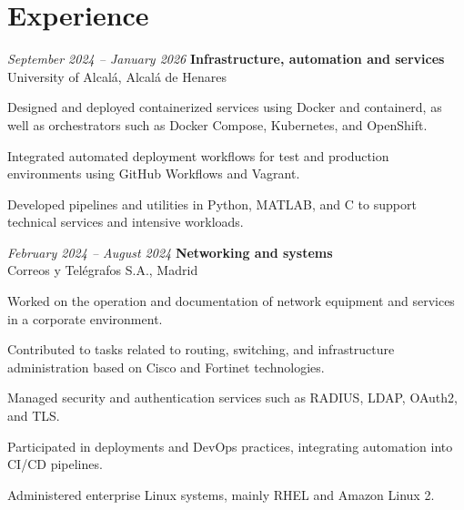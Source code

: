 \vspace{-7pt}

\section{Experience}

\begin{twocolentry}{\textit{September 2024 – January 2026}}
	\textbf{Infrastructure, automation and services} \\
	University of Alcalá, Alcalá de Henares
\end{twocolentry}
\begin{onecolentry}
	\begin{highlights}
		\item Designed and deployed containerized services using Docker and containerd, as well as orchestrators such as Docker Compose, Kubernetes, and OpenShift.
		\item Integrated automated deployment workflows for test and production environments using GitHub Workflows and Vagrant.
		\item Developed pipelines and utilities in Python, MATLAB, and C to support technical services and intensive workloads.
	\end{highlights}
\end{onecolentry}

\vspace{0.2 cm}

\begin{twocolentry}{\textit{February 2024 – August 2024}}
	\textbf{Networking and systems} \\
	Correos y Telégrafos S.A., Madrid
\end{twocolentry}
\begin{onecolentry}
	\begin{highlights}
		\item Worked on the operation and documentation of network equipment and services in a corporate environment.
		\item Contributed to tasks related to routing, switching, and infrastructure administration based on Cisco and Fortinet technologies.
		\item Managed security and authentication services such as RADIUS, LDAP, OAuth2, and TLS.
		\item Participated in deployments and DevOps practices, integrating automation into CI/CD pipelines.
		\item Administered enterprise Linux systems, mainly RHEL and Amazon Linux 2.
	\end{highlights}
\end{onecolentry}

